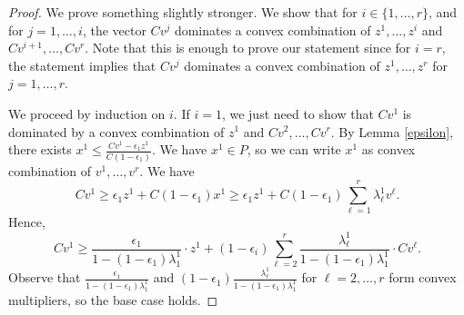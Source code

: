 \begin{proof}
	
	
	We prove something slightly stronger. We show that for $i\in\{1,\ldots,r\}$, and for $j=1,\ldots,i$, the vector $Cv^j$ dominates  a convex combination of $z^1,\ldots,z^i$ and $Cv^{i+1},\ldots,Cv^r$. Note that this is enough to prove our statement since for $i=r$, the statement implies that $Cv^j$ dominates a convex combination of $z^1,\ldots,z^r$ for $j=1,\ldots,r$. 
	
	We proceed by induction on $i$. If $i=1$, we just need to show that $Cv^1$ is dominated by a convex combination of $z^1$ and $Cv^2,\ldots,Cv^r$. By Lemma \ref{epsilon}, there exists $x^1\leq  \frac{Cv^1-\epsilon_1z^1}{C(1-\epsilon_1)}$. We have $x^1\in P$, so we can write $x^1$ as convex combination of $v^1,\ldots, v^r$. We have
	\begin{equation*}
	Cv^1 \geq  \epsilon_1z^1 + C(1-\epsilon_1)x^1 \geq \epsilon_1z^1 + C(1-\epsilon_1) \sum_{\ell=1}^{r}\lambda^1_\ell v^\ell.
	\end{equation*}
	Hence,
	\begin{equation}\label{equation6}
	Cv^1 \geq \frac{\epsilon_1}{1-(1-\epsilon_1)\lambda^1_1}\cdot z^1 + (1-\epsilon_i)\sum_{\ell=2}^{r} \frac{\lambda^1_\ell}{1-(1-\epsilon_1)\lambda_1^1}\cdot Cv^\ell.
	\end{equation}
	Observe that $\frac{\epsilon_1}{1-(1-\epsilon_1)\lambda^1_1}$ and $(1-\epsilon_1)\frac{\lambda^1_\ell}{1-(1-\epsilon_1)\lambda_1^1}$ for $\ell=2,\ldots,r$ form convex multipliers, so the base case holds.
	

\end{proof}
